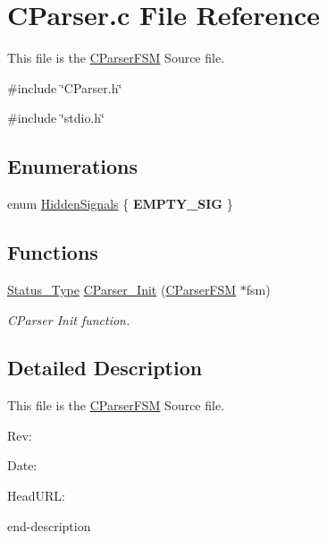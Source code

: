 \section{CParser.c File Reference}
\label{_c_parser_8c}


This file is the \hyperlink{struct_c_parser_f_s_m}{CParserFSM} Source file.  


{\ttfamily \#include \char`\"{}CParser.h\char`\"{}}\par
{\ttfamily \#include \char`\"{}stdio.h\char`\"{}}\par
\subsection*{Enumerations}
\begin{DoxyCompactItemize}
\item 
enum \hyperlink{group___c_parser_ga9f2e0737608155a8882726332068ca89}{HiddenSignals} \{ {\bfseries EMPTY\_\-SIG}
 \}
\end{DoxyCompactItemize}
\subsection*{Functions}
\begin{DoxyCompactItemize}
\item 
\hyperlink{group___f_s_m_ga3ef97600b5131dbf1b9a798e760e9268}{Status\_\-Type} \hyperlink{group___c_parser_gadc7edd159a43c4d49eac247a456763be}{CParser\_\-Init} (\hyperlink{struct_c_parser_f_s_m}{CParserFSM} $\ast$fsm)
\begin{DoxyCompactList}\small\item\em CParser Init function. \end{DoxyCompactList}\end{DoxyCompactItemize}


\subsection{Detailed Description}
This file is the \hyperlink{struct_c_parser_f_s_m}{CParserFSM} Source file. \begin{DoxyParagraph}{Rev:}

\end{DoxyParagraph}
\begin{DoxyParagraph}{Date:}

\end{DoxyParagraph}
\begin{DoxyParagraph}{HeadURL:}

\end{DoxyParagraph}


end-\/description 